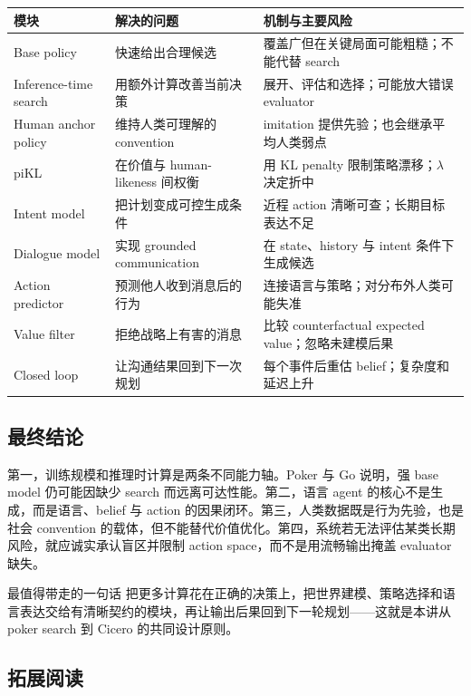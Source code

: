 \documentclass[a4paper]{article}
\begin{document}
\begin{longtable}{L{0.20\textwidth}L{0.30\textwidth}L{0.40\textwidth}}
\toprule
模块 & 解决的问题 & 机制与主要风险 \\
\midrule
Base policy & 快速给出合理候选 & 覆盖广但在关键局面可能粗糙；不能代替 search \\
Inference-time search & 用额外计算改善当前决策 & 展开、评估和选择；可能放大错误 evaluator \\
Human anchor policy & 维持人类可理解的 convention & imitation 提供先验；也会继承平均人类弱点 \\
piKL & 在价值与 human-likeness 间权衡 & 用 KL penalty 限制策略漂移；$\lambda$ 决定折中 \\
Intent model & 把计划变成可控生成条件 & 近程 action 清晰可查；长期目标表达不足 \\
Dialogue model & 实现 grounded communication & 在 state、history 与 intent 条件下生成候选 \\
Action predictor & 预测他人收到消息后的行为 & 连接语言与策略；对分布外人类可能失准 \\
Value filter & 拒绝战略上有害的消息 & 比较 counterfactual expected value；忽略未建模后果 \\
Closed loop & 让沟通结果回到下一次规划 & 每个事件后重估 belief；复杂度和延迟上升 \\
\bottomrule
\end{longtable}

\subsection{最终结论}

第一，训练规模和推理时计算是两条不同能力轴。Poker 与 Go 说明，强 base model 仍可能因缺少 search 而远离可达性能。第二，语言 agent 的核心不是生成，而是语言、belief 与 action 的因果闭环。第三，人类数据既是行为先验，也是社会 convention 的载体，但不能替代价值优化。第四，系统若无法评估某类长期风险，就应诚实承认盲区并限制 action space，而不是用流畅输出掩盖 evaluator 缺失。

\begin{importantbox}{最值得带走的一句话}
把更多计算花在正确的决策上，把世界建模、策略选择和语言表达交给有清晰契约的模块，再让输出后果回到下一轮规划——这就是本讲从 poker search 到 Cicero 的共同设计原则。
\end{importantbox}

\subsection{拓展阅读}
\end{document}
